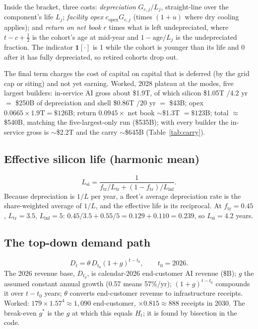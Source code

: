 \documentclass[11pt,letterpaper]{article}
\begin{document}
Inside the bracket, three costs: \emph{depreciation} $G_{c,j}/L_j$, straight-line over the component's life $L_j$; \emph{facility opex} $c_{\text{opex}}G_{c,j}$ (times $(1+u)$ where dry cooling applies); and \emph{return on net book} $r$ times what is left undepreciated, where $t-c+\tfrac12$ is the cohort's age at mid-year and $1-\text{age}/L_j$ is the undepreciated fraction. The indicator $\mathbf{1}[\cdot]$ is 1 while the cohort is younger than its life and 0 after it has fully depreciated, so retired cohorts drop out.

The final term charges the cost of capital on capital that is deferred (by the grid cap or siting) and not yet earning. Worked, 2028 plateau at the modes, five largest builders: in-service AI gross about \$1.9T, of which silicon \$1.05T $/4.2$ yr $=$ \$250B of depreciation and shell \$0.86T $/20$ yr $=$ \$43B; opex $0.0665\times1.9\text{T}=\$126$B; return $0.0945\times$ net book $\sim$\$1.3T $=\$123$B; total $\approx$ \$540B, matching the five-largest-only run (\$535B); with every builder the in-service gross is $\sim$\$2.2T and the carry $\sim$\$645B (Table~\ref{tab:carry}).

\subsection*{Effective silicon life (harmonic mean)}
\[L_{\text{si}}=\frac{1}{f_{\text{tr}}/L_{\text{tr}}+(1-f_{\text{tr}})/L_{\text{inf}}}.\]
Because depreciation is $1/L$ per year, a fleet's average depreciation rate is the share-weighted average of $1/L$, and the effective life is its reciprocal. At $f_{\text{tr}}=0.45$, $L_{\text{tr}}=3.5$, $L_{\text{inf}}=5$: $0.45/3.5+0.55/5=0.129+0.110=0.239$, so $L_{\text{si}}=4.2$ years.

\subsection*{The top-down demand path}
\[D_t=\theta\,D_{t_0}(1+g)^{t-t_0},\qquad t_0=2026.\]
The 2026 revenue base, $D_{t_0}$, is calendar-2026 end-customer AI revenue (\$B); $g$ the assumed constant annual growth (0.57 means 57\%/yr); $(1+g)^{t-t_0}$ compounds it over $t-t_0$ years; $\theta$ converts end-customer revenue to infrastructure receipts. Worked: $179\times1.57^{4}\approx1{,}090$ end-customer, $\times0.815\approx888$ receipts in 2030. The break-even $g^{*}$ is the $g$ at which this equals $H_t$; it is found by bisection in the code.
\end{document}
